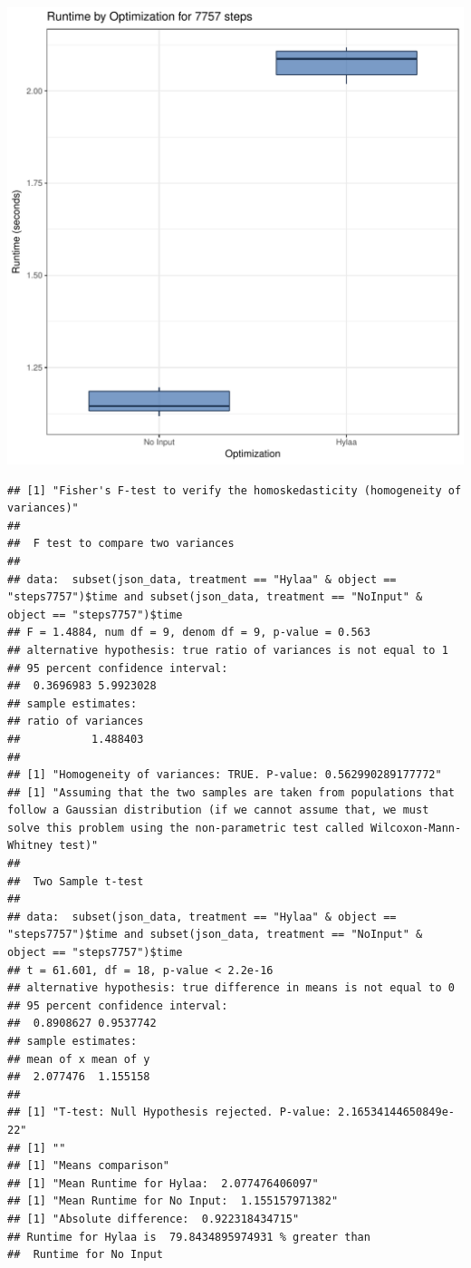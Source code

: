 \documentclass{article}\usepackage[]{graphicx}\usepackage[]{color}
\makeatletter
\def\maxwidth{ %
  \ifdim\Gin@nat@width>\linewidth
    \linewidth
  \else
    \Gin@nat@width
  \fi
}
\newenvironment{kframe}{%
 \def\at@end@of@kframe{}%
 \ifinner\ifhmode%
  \def\at@end@of@kframe{\end{minipage}}%
  \begin{minipage}{\columnwidth}%
 \fi\fi%
 \def\FrameCommand##1{\hskip\@totalleftmargin \hskip-\fboxsep
 \colorbox{shadecolor}{##1}\hskip-\fboxsep
     \hskip-\linewidth \hskip-\@totalleftmargin \hskip\columnwidth}%
 \MakeFramed {\advance\hsize-\width
   \@totalleftmargin\z@ \linewidth\hsize
   \@setminipage}}%
 {\par\unskip\endMakeFramed%
 \at@end@of@kframe}
\newenvironment{knitrout}{}{} %
\makeatother
\begin{document}
\begin{knitrout}
\color{fgcolor}
\includegraphics[width=\maxwidth]{figure/RH4_steps7757-1} 
\begin{kframe}\begin{verbatim}
## [1] "Fisher's F-test to verify the homoskedasticity (homogeneity of variances)"
## 
## 	F test to compare two variances
## 
## data:  subset(json_data, treatment == "Hylaa" & object == "steps7757")$time and subset(json_data, treatment == "NoInput" & object == "steps7757")$time
## F = 1.4884, num df = 9, denom df = 9, p-value = 0.563
## alternative hypothesis: true ratio of variances is not equal to 1
## 95 percent confidence interval:
##  0.3696983 5.9923028
## sample estimates:
## ratio of variances 
##           1.488403 
## 
## [1] "Homogeneity of variances: TRUE. P-value: 0.562990289177772"
## [1] "Assuming that the two samples are taken from populations that follow a Gaussian distribution (if we cannot assume that, we must solve this problem using the non-parametric test called Wilcoxon-Mann-Whitney test)"
## 
## 	Two Sample t-test
## 
## data:  subset(json_data, treatment == "Hylaa" & object == "steps7757")$time and subset(json_data, treatment == "NoInput" & object == "steps7757")$time
## t = 61.601, df = 18, p-value < 2.2e-16
## alternative hypothesis: true difference in means is not equal to 0
## 95 percent confidence interval:
##  0.8908627 0.9537742
## sample estimates:
## mean of x mean of y 
##  2.077476  1.155158 
## 
## [1] "T-test: Null Hypothesis rejected. P-value: 2.16534144650849e-22"
## [1] ""
## [1] "Means comparison"
## [1] "Mean Runtime for Hylaa:  2.077476406097"
## [1] "Mean Runtime for No Input:  1.155157971382"
## [1] "Absolute difference:  0.922318434715"
## Runtime for Hylaa is  79.8434895974931 % greater than 
##  Runtime for No Input
\end{verbatim}
\end{kframe}
\end{knitrout}
\end{document}
